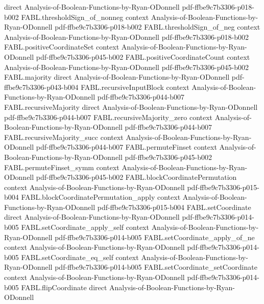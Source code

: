 \begin{theorem}
  {direct}
  {Analysis-of-Boolean-Functions-by-Ryan-ODonnell}
  {pdf-ffbe9c7b3306-p018-b002}
\proofstep
  {FABL.thresholdSign_of_nonneg}
  {context}
  {Analysis-of-Boolean-Functions-by-Ryan-ODonnell}
  {pdf-ffbe9c7b3306-p018-b002}
\proofstep
  {FABL.thresholdSign_of_neg}
  {context}
  {Analysis-of-Boolean-Functions-by-Ryan-ODonnell}
  {pdf-ffbe9c7b3306-p018-b002}
\proofstep
  {FABL.positiveCoordinateSet}
  {context}
  {Analysis-of-Boolean-Functions-by-Ryan-ODonnell}
  {pdf-ffbe9c7b3306-p045-b002}
\proofstep
  {FABL.positiveCoordinateCount}
  {context}
  {Analysis-of-Boolean-Functions-by-Ryan-ODonnell}
  {pdf-ffbe9c7b3306-p045-b002}
\proofstep
  {FABL.majority}
  {direct}
  {Analysis-of-Boolean-Functions-by-Ryan-ODonnell}
  {pdf-ffbe9c7b3306-p043-b004}
\proofstep
  {FABL.recursiveInputBlock}
  {context}
  {Analysis-of-Boolean-Functions-by-Ryan-ODonnell}
  {pdf-ffbe9c7b3306-p044-b007}
\proofstep
  {FABL.recursiveMajority}
  {direct}
  {Analysis-of-Boolean-Functions-by-Ryan-ODonnell}
  {pdf-ffbe9c7b3306-p044-b007}
\proofstep
  {FABL.recursiveMajority_zero}
  {context}
  {Analysis-of-Boolean-Functions-by-Ryan-ODonnell}
  {pdf-ffbe9c7b3306-p044-b007}
\proofstep
  {FABL.recursiveMajority_succ}
  {context}
  {Analysis-of-Boolean-Functions-by-Ryan-ODonnell}
  {pdf-ffbe9c7b3306-p044-b007}
\proofstep
  {FABL.permuteFinset}
  {context}
  {Analysis-of-Boolean-Functions-by-Ryan-ODonnell}
  {pdf-ffbe9c7b3306-p045-b002}
\proofstep
  {FABL.permuteFinset_symm}
  {context}
  {Analysis-of-Boolean-Functions-by-Ryan-ODonnell}
  {pdf-ffbe9c7b3306-p045-b002}
\proofstep
  {FABL.blockCoordinatePermutation}
  {context}
  {Analysis-of-Boolean-Functions-by-Ryan-ODonnell}
  {pdf-ffbe9c7b3306-p015-b004}
\proofstep
  {FABL.blockCoordinatePermutation_apply}
  {context}
  {Analysis-of-Boolean-Functions-by-Ryan-ODonnell}
  {pdf-ffbe9c7b3306-p015-b004}
\proofstep
  {FABL.setCoordinate}
  {direct}
  {Analysis-of-Boolean-Functions-by-Ryan-ODonnell}
  {pdf-ffbe9c7b3306-p014-b005}
\proofstep
  {FABL.setCoordinate_apply_self}
  {context}
  {Analysis-of-Boolean-Functions-by-Ryan-ODonnell}
  {pdf-ffbe9c7b3306-p014-b005}
\proofstep
  {FABL.setCoordinate_apply_of_ne}
  {context}
  {Analysis-of-Boolean-Functions-by-Ryan-ODonnell}
  {pdf-ffbe9c7b3306-p014-b005}
\proofstep
  {FABL.setCoordinate_eq_self}
  {context}
  {Analysis-of-Boolean-Functions-by-Ryan-ODonnell}
  {pdf-ffbe9c7b3306-p014-b005}
\proofstep
  {FABL.setCoordinate_setCoordinate}
  {context}
  {Analysis-of-Boolean-Functions-by-Ryan-ODonnell}
  {pdf-ffbe9c7b3306-p014-b005}
\proofstep
  {FABL.flipCoordinate}
  {direct}
  {Analysis-of-Boolean-Functions-by-Ryan-ODonnell}

\end{theorem}
